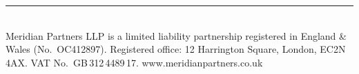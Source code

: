 \documentclass[10.5pt, a4paper]{article}
\newlength{\sideW}  \setlength{\sideW}{13mm}
\newlength{\gutterW}\setlength{\gutterW}{14mm}
\newlength{\bodyW}
\newcommand{\bodycol}[1]{%
  \par\noindent\hspace{\sideW}\hspace{\gutterW}%
  \begin{minipage}[t]{\bodyW}\raggedright #1\end{minipage}\par%
}
\begin{document}
\vfill
\bodycol{%
  {\color{gold}\rule{\bodyW}{0.6pt}}\\[2pt]
  {\color{subtle}\tiny
    Meridian Partners LLP is a limited liability partnership registered in England \&
    Wales (No.\ OC412897). Registered office: 12 Harrington Square, London, EC2N\,4AX.
    \enspace\textbullet\enspace
    VAT No.\ GB\,312\,4489\,17.
    \enspace\textbullet\enspace
    www.meridianpartners.co.uk}%
}
\end{document}
